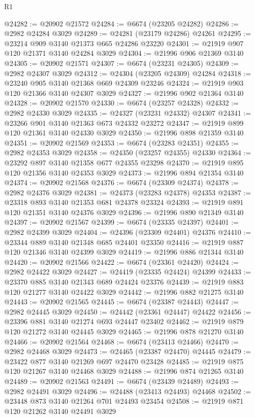 \begin{lexlean}{R1}
\begin{coremodule}
@24282 := @20902 @21572
@24284 := @6674 (@23205 @24282)
@24286 := @2982 @24284 @3029
@24289 := @24281 (@23179 @24286) @24261
@24295 := @23214 @909 @3140 @21373 @665 @24286 @23220
@24301 := @21919 @907 @120 @21371 @3140 @24284 @3029
@24304 := @21996 @906 @21369 @3140
@24305 := @20902 @21571
@24307 := @6674 (@23231 @24305)
@24309 := @2982 @24307 @3029
@24312 := @24304 (@23205 @24309) @24284
@24318 := @23240 @905 @3140 @21368 @669 @24309 @23246
@24324 := @21919 @903 @120 @21366 @3140 @24307 @3029
@24327 := @21996 @902 @21364 @3140
@24328 := @20902 @21570
@24330 := @6674 (@23257 @24328)
@24332 := @2982 @24330 @3029
@24335 := @24327 (@23231 @24332) @24307
@24341 := @23266 @901 @3140 @21363 @673 @24332 @23272
@24347 := @21919 @899 @120 @21361 @3140 @24330 @3029
@24350 := @21996 @898 @21359 @3140
@24351 := @20902 @21569
@24353 := @6674 (@23283 @24351)
@24355 := @2982 @24353 @3029
@24358 := @24350 (@23257 @24355) @24330
@24364 := @23292 @897 @3140 @21358 @677 @24355 @23298
@24370 := @21919 @895 @120 @21356 @3140 @24353 @3029
@24373 := @21996 @894 @21354 @3140
@24374 := @20902 @21568
@24376 := @6674 (@23309 @24374)
@24378 := @2982 @24376 @3029
@24381 := @24373 (@23283 @24378) @24353
@24387 := @23318 @893 @3140 @21353 @681 @24378 @23324
@24393 := @21919 @891 @120 @21351 @3140 @24376 @3029
@24396 := @21996 @890 @21349 @3140
@24397 := @20902 @21567
@24399 := @6674 (@23335 @24397)
@24401 := @2982 @24399 @3029
@24404 := @24396 (@23309 @24401) @24376
@24410 := @23344 @889 @3140 @21348 @685 @24401 @23350
@24416 := @21919 @887 @120 @21346 @3140 @24399 @3029
@24419 := @21996 @886 @21344 @3140
@24420 := @20902 @21566
@24422 := @6674 (@23361 @24420)
@24424 := @2982 @24422 @3029
@24427 := @24419 (@23335 @24424) @24399
@24433 := @23370 @885 @3140 @21343 @689 @24424 @23376
@24439 := @21919 @883 @120 @21277 @3140 @24422 @3029
@24442 := @21996 @882 @21275 @3140
@24443 := @20902 @21565
@24445 := @6674 (@23387 @24443)
@24447 := @2982 @24445 @3029
@24450 := @24442 (@23361 @24447) @24422
@24456 := @23396 @881 @3140 @21274 @693 @24447 @23402
@24462 := @21919 @879 @120 @21272 @3140 @24445 @3029
@24465 := @21996 @878 @21270 @3140
@24466 := @20902 @21564
@24468 := @6674 (@23413 @24466)
@24470 := @2982 @24468 @3029
@24473 := @24465 (@23387 @24470) @24445
@24479 := @23422 @877 @3140 @21269 @697 @24470 @23428
@24485 := @21919 @875 @120 @21267 @3140 @24468 @3029
@24488 := @21996 @874 @21265 @3140
@24489 := @20902 @21563
@24491 := @6674 (@23439 @24489)
@24493 := @2982 @24491 @3029
@24496 := @24488 (@23413 @24493) @24468
@24502 := @23448 @873 @3140 @21264 @701 @24493 @23454
@24508 := @21919 @871 @120 @21262 @3140 @24491 @3029

\end{coremodule}
\end{lexlean}
